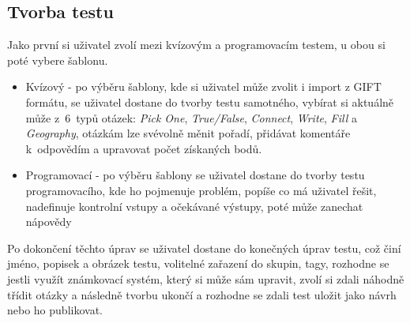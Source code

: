 \documentclass[12pt, a4paper,
openright
]{report}
\begin{document}
\subsection{Tvorba testu}
\label{subsec:creation}
Jako první si uživatel zvolí mezi kvízovým a programovacím testem, u obou si poté vybere šablonu.
\begin{itemize}
	\item Kvízový - po výběru šablony, kde si uživatel může zvolit i import z GIFT formátu, se uživatel dostane do tvorby testu samotného, vybírat si aktuálně může z~6~typů otázek: \textit{Pick One}, \textit{True/False}, \textit{Connect}, \textit{Write}, \textit{Fill} a \textit{Geography}, otázkám lze svévolně měnit pořadí, přidávat komentáře k~odpovědím a upravovat počet získaných bodů.
	\item Programovací - po výběru šablony se uživatel dostane do tvorby testu programovacího, kde ho pojmenuje problém, popíše co má uživatel řešit, nadefinuje kontrolní vstupy a očekávané výstupy, poté může zanechat nápovědy
\end{itemize}
Po dokončení těchto úprav se uživatel dostane do konečných úprav testu, což činí jméno, popisek a obrázek testu, volitelné zařazení do skupin, tagy, rozhodne se jestli využít známkovací systém, který si může sám upravit, zvolí si zdali náhodně třídit otázky a následně tvorbu ukončí a rozhodne se zdali test uložit jako návrh nebo ho publikovat.
\end{document}
